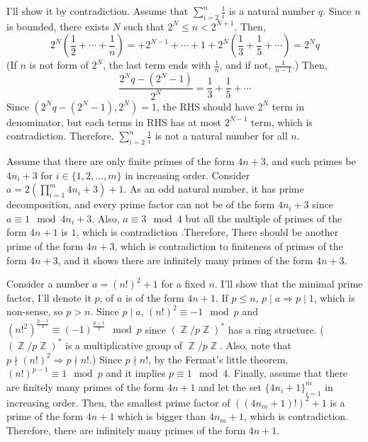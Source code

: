 \documentclass[12pt]{article}
\newenvironment{problem}[2][Problem]{\begin{trivlist}
\item[\hskip \labelsep {\bfseries #1}\hskip \labelsep {\bfseries #2.}]}{\end{trivlist}}
\DeclareMathOperator{\zz}{\mathbb{Z}}
\begin{document}
\begin{problem}{4}
\end{problem}
I'll show it by contradiction. Assume that $\sum\limits_{i=2}^n \frac{1}{i}$ is a natural number $q$. Since $n$ is bounded, there exists $N$ such that $2^N\leq n < 2^{N+1}$. Then,
\begin{equation*}
2^N\left(\frac{1}{2}+\cdots +\frac{1}{n}\right)=+2^{N-1}+\cdots+1+2^N\left(\frac{1}{3}+\frac{1}{5}+\cdots\right)=2^N q
\end{equation*}
(If $n$ is not form of $2^N$, the last term ends with $\frac{1}{n}$, and if not, $\frac{1}{n-1}$.)
Then,
\begin{equation*}
\frac{2^N q-(2^{N}-1)}{2^N}=\frac{1}{3}+\frac{1}{5}+\cdots
\end{equation*}
Since $(2^N q-(2^{N}-1), 2^N)=1$, the RHS should have $2^N$ term in denominator, but each terms in RHS has at most $2^{N-1}$ term, which is contradiction. Therefore, $\sum\limits_{i=2}^n \frac{1}{i}$ is not a natural number for all $n$.




\begin{problem}{5}
\end{problem}
Assume that there are only finite primes of the form $4n+3$, and such primes be $4n_i+3$ for $i\in \{1, 2, \ldots, m\}$ in increasing order. Consider $a=2\left(\prod_{i=1}^m 4n_i+3\right)+1$. As an odd natural number, it has prime decomposition, and every prime factor can not be of the form $4n_i+3$ since $a \equiv 1\mod 4n_i+3$. Also, $a \equiv 3\mod 4$ but all the multiple of primes of the form $4n+1$ is $1$, which is contradiction .Therefore, There should be another prime of the form $4n+3$, which is contradiction to finiteness of primes of the form $4n+3$, and it shows there are infinitely many primes of the form $4n+3$.




\begin{problem}{6}
\end{problem}
Consider a number $a=(n!)^2+1$ for a fixed $n$. I'll show that the minimal prime factor, I'll denote it $p$, of $a$ is of the form $4n+1$. If $p\leq n$, $p\mid a\Rightarrow p\mid 1$, which is non-sense, so $p>n$. Since $p\mid a$, $(n!)^2\equiv -1\mod p$ and $(n!^2)^{\frac{p-1}{2}}\equiv (-1)^{\frac{p-1}{2}} \mod p$ since $(\zz/p\zz)^*$ has a ring structure. ($(\zz/p\zz)^*$ is a multiplicative group of $\zz/p\zz$. Also, note that $p\nmid (n!)^2\Rightarrow p\nmid n!$.) Since $p\nmid n!$, by the Fermat's little theorem, $(n!)^{p-1}\equiv 1 \mod p$ and it implies $p \equiv 1 \mod 4$.
Finally, assume that there are finitely many primes of the form $4n+1$ and let the set $\{4n_i+1\}_{i=1}^m$ in increasing order. Then, the smallest prime factor of $((4n_m+1)!)^2+1$ is a prime of the form $4n+1$ which is bigger than $4n_m+1$, which is contradiction. Therefore, there are infinitely many primes of the form $4n+1$.
\end{document}
